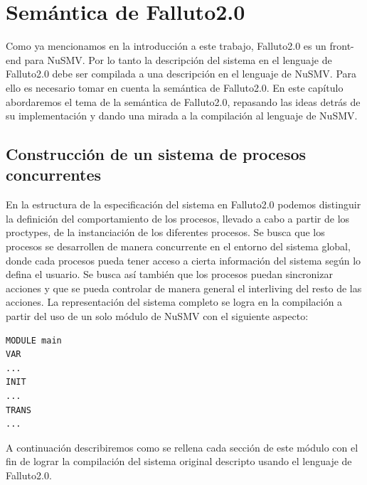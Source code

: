 \documentclass[titlepage, 12pt]{book}
\begin{document}


\chapter{Sem\'antica de Falluto2.0}
Como ya mencionamos en la introducci\'on a este trabajo, Falluto2.0 es un front-end para NuSMV. Por lo tanto la descripci\'on del sistema en el lenguaje de Falluto2.0 debe ser compilada a una descripci\'on en el lenguaje de NuSMV. Para ello es necesario tomar en cuenta la sem\'antica de Falluto2.0. En este cap\'itulo abordaremos el tema de la sem\'antica de Falluto2.0, repasando las ideas detr\'as de su implementaci\'on y dando una mirada a la compilaci\'on al lenguaje de NuSMV.

\section{Construcci\'on de un sistema de procesos concurrentes}
En la estructura de la especificaci\'on del sistema en Falluto2.0 podemos distinguir la definici\'on del comportamiento de los procesos, llevado a cabo a partir de los proctypes, de la instanciaci\'on de los diferentes procesos. Se busca que los procesos se desarrollen de manera concurrente en el entorno del sistema global, donde cada procesos pueda tener acceso a cierta informaci\'on del sistema seg\'un lo defina el usuario. Se busca as\'i tambi\'en que los procesos puedan sincronizar acciones y que se pueda controlar de manera general el interliving del resto de las acciones.
La representaci\'on del sistema completo se logra en la compilaci\'on a partir del uso de un solo m\'odulo de NuSMV con el siguiente aspecto:
\begin{verbatim}
MODULE main
VAR
...
INIT
...
TRANS
...
\end{verbatim}
A continuaci\'on describiremos como se rellena cada secci\'on de este m\'odulo con el fin de lograr la compilaci\'on del sistema original descripto usando el lenguaje de Falluto2.0.\\
\end{document}
